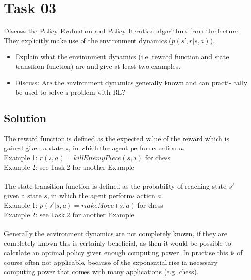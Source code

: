 \documentclass[a4paper,12pt]{scrartcl}
\begin{document}
\section*{Task 03}
Discuss the Policy Evaluation and Policy Iteration algorithms from the lecture.
They explicitly make use of the environment dynamics ($p(s', r|s, a)$).
\begin{itemize}
\item Explain what the environment dynamics (i.e. reward function and state
transition function) are and give at least two examples.
\item Discuss: Are the environment dynamics generally known and can practi-
cally be used to solve a problem with RL?
\end{itemize}

\subsection*{Solution}

The reward function is defined as the expected value of the reward which is gained given a state $s$, in which the agent performs action $a$.\\
\indent Example 1: $r(s,a) = killEnemyPiece(s,a)$ for chess\\
\indent Example 2: see Task 2 for another Example\\\\
The state transition function is defined as the probability of reaching state $s'$ given a state $s$, in which the agent performs action $a$. \\
\indent Example 1: $p(s'|s,a) = makeMove(s,a)$ for chess\\
\indent Example 2: see Task 2 for another Example\\\\
Generally the environment dynamics are not completely known, if they are completely known this is certainly beneficial, as then it would be possible to calculate an optimal policy given enough computing power. In practise this is of course often not applicable, because of the exponential rise in necessary computing power that comes with many applications (e.g. chess).
\end{document}
